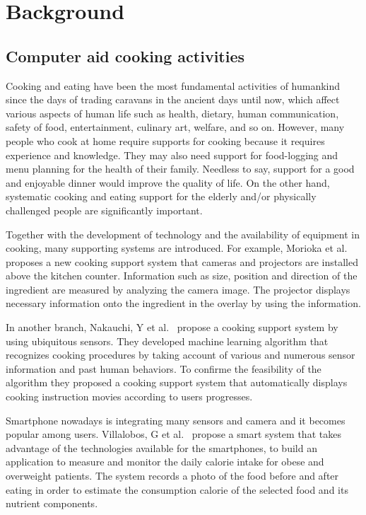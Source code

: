 \chapter{Background}\label{chap:bg}

\section{Computer aid cooking activities}

Cooking and eating have been the most fundamental activities of humankind since the days of trading caravans in the ancient days until now, which affect various aspects of human life such as health, dietary, human communication, safety of food, entertainment, culinary art, welfare, and so on. However, many people who cook at home require supports for cooking because it requires experience and knowledge. They may also need support for food-logging and menu planning for the health of their family. Needless to say, support for a good and enjoyable dinner would improve the quality of life. On the other hand, systematic cooking and eating support for the elderly and/or physically challenged people are significantly important.

Together with the development of technology and the availability of equipment in cooking, many supporting systems are introduced. For example, Morioka et al.~\cite{morioka:camera-projecter} proposes a new cooking support system that cameras and projectors are installed above the kitchen counter. Information such as size, position and direction of the ingredient are measured by analyzing the camera image. The projector displays necessary information onto the ingredient in the overlay by using the information.

In another branch, Nakauchi, Y et al.~\cite{nakauchi:recog} propose a cooking support system by using ubiquitous sensors. They developed machine learning algorithm that recognizes cooking procedures by taking account of various and numerous sensor information and past human behaviors. To confirme the feasibility of the algorithm they proposed a cooking support system that automatically displays cooking instruction movies according to users progresses. 

Smartphone nowadays is integrating many sensors and camera and it becomes popular among users. Villalobos, G et al.~\cite{villalobos:image-calorie} propose a smart system that takes advantage of the technologies available for the smartphones, to build an application to measure and monitor the daily calorie intake for obese and overweight patients. The system records a photo of the food before and after eating in order to estimate the consumption calorie of the selected food and its nutrient components.

